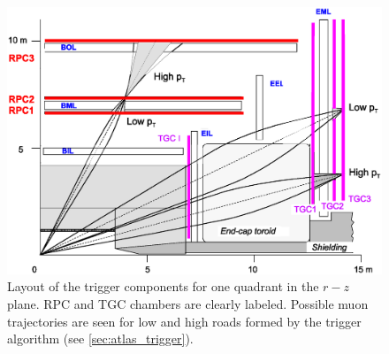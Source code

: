 \begin{figure}[ht]
\centering
\includegraphics[width=.7\textwidth]{figures/atlas/ms_trigger_layout.eps}
\caption{Layout of the trigger components for one quadrant
in the $r-z$ plane. RPC and TGC chambers are clearly labeled. Possible
muon trajectories are seen for low and high \pt roads formed
by the trigger algorithm (see \sec\ref{sec:atlas_trigger}).}
\label{fig:atlas_ms_trigger_layout}
\end{figure}

